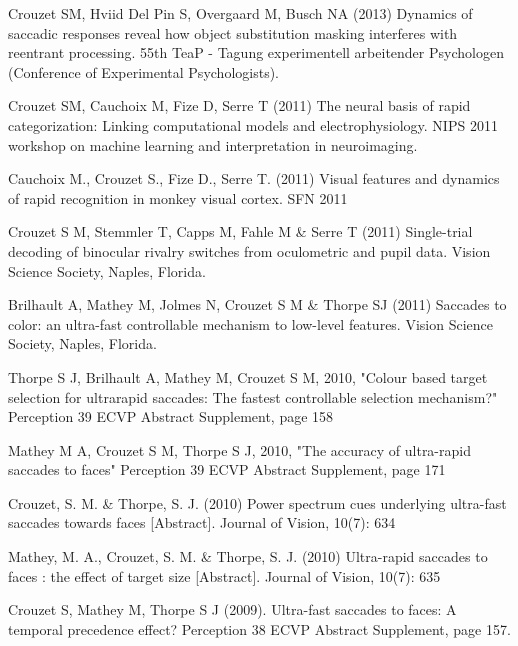 \documentclass[margin,line]{resume}
\begin{document}
\begin{resume}
	\newpage

	\vspace{-2mm} Crouzet SM, Hviid Del Pin S, Overgaard M, Busch NA (2013) Dynamics of saccadic responses reveal how object substitution masking interferes with reentrant processing. 55th TeaP - Tagung experimentell arbeitender Psychologen (Conference of Experimental Psychologists).

	\vspace{-2mm} Crouzet SM, Cauchoix M, Fize D, Serre T (2011) The neural basis of rapid categorization: Linking computational models and electrophysiology. NIPS 2011 workshop on machine learning and interpretation in neuroimaging.

	\vspace{-2mm} Cauchoix M., Crouzet S., Fize D., Serre T. (2011) Visual features and dynamics of rapid recognition in monkey visual cortex. SFN 2011

	\vspace{-2mm} Crouzet S M, Stemmler T, Capps M, Fahle M \& Serre T (2011) Single-trial decoding of binocular rivalry switches from oculometric and pupil data. Vision Science Society, Naples, Florida.

	\vspace{-2mm} Brilhault A, Mathey M, Jolmes N, Crouzet S M \& Thorpe SJ (2011) Saccades to color: an ultra-fast controllable mechanism to low-level features. Vision Science Society, Naples, Florida.

	\vspace{-2mm} Thorpe S J, Brilhault A, Mathey M, Crouzet S M, 2010, "Colour based target selection for ultrarapid saccades: The fastest controllable selection mechanism?" Perception 39 ECVP Abstract Supplement, page 158

	\vspace{-2mm} Mathey M A, Crouzet S M, Thorpe S J, 2010, "The accuracy of ultra-rapid saccades to faces" Perception 39 ECVP Abstract Supplement, page 171

	\vspace{-2mm} Crouzet, S. M. \& Thorpe, S. J. (2010) Power spectrum cues underlying ultra-fast saccades towards faces [Abstract]. Journal of Vision, 10(7): 634

	\vspace{-2mm} Mathey, M. A., Crouzet, S. M. \& Thorpe, S. J. (2010) Ultra-rapid saccades to faces : the effect of target size [Abstract]. Journal of Vision, 10(7): 635

	\vspace{-2mm} Crouzet S, Mathey M, Thorpe S J (2009). Ultra-fast saccades to faces: A temporal precedence effect? Perception 38 ECVP Abstract Supplement, page 157.


\end{resume}
\end{document}
